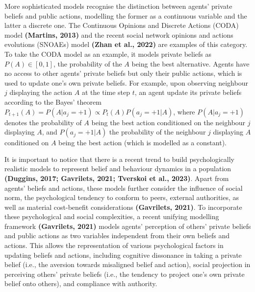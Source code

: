 \documentclass[
  11pt,
]{article}
\begin{document}
More sophisticated models recognise the distinction between agents'
private beliefs and public actions, modelling the former as a continuous
variable and the latter a discrete one. The Continuous Opinions and
Discrete Actions (CODA) model \textbf{(Martins, 2013)} and the recent
social network opinions and actions evolutions (SNOAEs) model
\textbf{(Zhan et al., 2022)} are examples of this category. To take the
CODA model as an example, it models private beliefs as
\(P(A) \in [0,1]\), the probability of the \(A\) being the best
alternative. Agents have no access to other agents' private beliefs but
only their public actions, which is used to update one's own private
beliefs. For example, upon observing neighbour \(j\) displaying the
action \(A\) at the time step \(t\), an agent update its private beliefs
according to the Bayes' theorem
\(P_{t+1}(A) = P(A | a_j = +1) \propto P_t(A) P(a_j = +1 | A)\), where
\(P(A | a_j = +1)\) denotes the probability of \(A\) being the best
action conditioned on the neighbour \(j\) displaying \(A\), and
\(P(a_j = +1 | A)\) the probability of the neighbour \(j\) displaying
\(A\) conditioned on \(A\) being the best action (which is modelled as a
constant).

It is important to notice that there is a recent trend to build
psychologically realistic models to represent belief and behaviour
dynamics in a population \textbf{(Duggins, 2017; Gavrilets, 2021;
Tverskoi et al., 2023)}. Apart from agents' beliefs and actions, these
models further consider the influence of social norm, the psychological
tendency to conform to peers, external authorities, as well as material
cost-benefit considerations \textbf{(Gavrilets, 2021)}. To incorporate
these psychological and social complexities, a recent unifying modelling
framework \textbf{(Gavrilets, 2021)} models agents' perception of
others' private beliefs and public actions as two variables independent
from their own beliefs and actions. This allows the representation of
various psychological factors in updating beliefs and actions, including
cognitive dissonance in taking a private belief (i.e., the aversion
towards misaligned belief and action), social projection in perceiving
others' private beliefs (i.e., the tendency to project one's own private
belief onto others), and compliance with authority.
\end{document}

